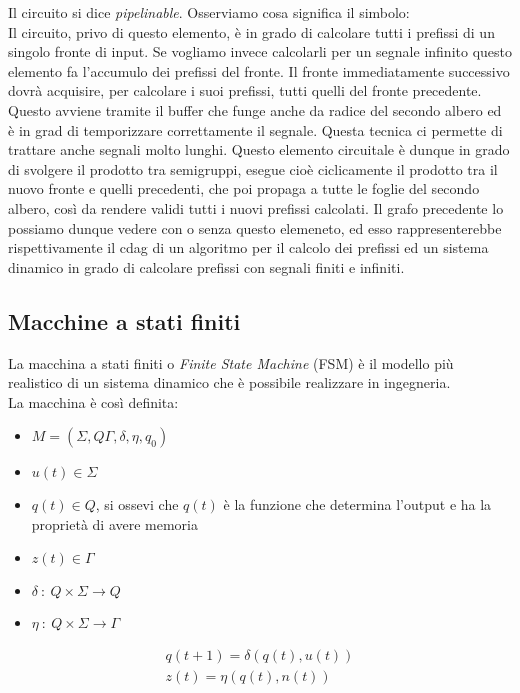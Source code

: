 \documentclass[a4paper,portrait,12pt]{article}
\theoremstyle{definition}
\begin{document}
Il circuito si dice \textit{pipelinable}.
Osserviamo cosa significa il simbolo:\\

Il circuito, privo di questo elemento, è in grado di calcolare tutti i prefissi di un singolo fronte di input.
Se vogliamo invece calcolarli per un segnale infinito questo elemento fa l’accumulo dei prefissi del fronte.
Il fronte immediatamente successivo dovrà acquisire, per calcolare i suoi prefissi, tutti quelli del fronte precedente.
Questo avviene tramite il buffer che funge anche da radice del secondo albero ed è in grad di temporizzare correttamente il segnale.
Questa tecnica ci permette di trattare anche segnali molto
lunghi.
Questo elemento circuitale è dunque in grado di svolgere il prodotto tra semigruppi, esegue cioè ciclicamente il prodotto tra il nuovo fronte e quelli precedenti, che poi propaga a tutte le foglie del secondo albero, così da rendere validi tutti i nuovi prefissi calcolati.
Il grafo precedente lo possiamo dunque vedere con o senza questo elemeneto, ed esso rappresenterebbe rispettivamente il cdag di un algoritmo per il calcolo dei prefissi ed un sistema dinamico in grado di calcolare prefissi con segnali finiti e infiniti.


\subsection{Macchine a stati finiti}

La macchina a stati finiti o \textit{Finite State Machine} (FSM) è il modello più realistico di un sistema dinamico che è possibile realizzare in ingegneria.\\

La macchina è così definita:
\begin{itemize}
\item $M = (\Sigma, Q \Gamma, \delta, \eta, q_0)$
\item $u(t) \in \Sigma$
\item $q(t) \in Q$, si ossevi che $q(t)$ è la funzione che determina l'output e ha la proprietà di avere memoria
\item $z(t) \in \Gamma$
\item $\delta\ :\ Q \times \Sigma \to Q$
\item $\eta\ :\ Q \times \Sigma \to \Gamma$
\end{itemize}

\begin{gather*}
q(t+1) = \delta(q(t), u(t))\\
z(t) = \eta(q(t),n(t))
\end{gather*}
\end{document}
